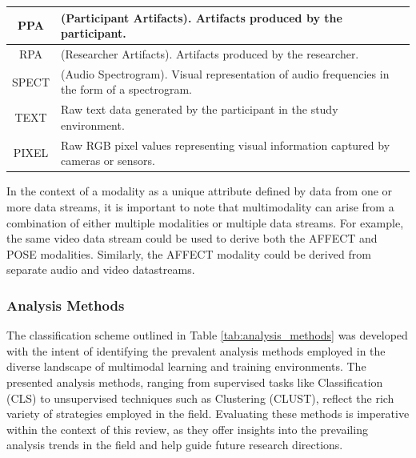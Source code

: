 \documentclass[manuscript,screen,review]{acmart}
\begin{document}
\begin{table}[ht]
\begin{tabular}{|c|p{}|}
    \hline
    PPA & (Participant Artifacts). Artifacts produced by the participant. \\
    \hline
    RPA & (Researcher Artifacts). Artifacts produced by the researcher. \\
    \hline
    SPECT & (Audio Spectrogram). Visual representation of audio frequencies in the form of a spectrogram. \\
    \hline
    TEXT & Raw text data generated by the participant in the study environment. \\
    \hline
    PIXEL & Raw RGB pixel values representing visual information captured by cameras or sensors. \\
    \hline
  \end{tabular}
  \label{tab:modalities}
\end{table}

In the context of a modality as a unique attribute defined by data from one or more data streams, it is important to note that multimodality can arise from a combination of either multiple modalities or multiple data streams. For example, the same video data stream could be used to derive both the AFFECT and POSE modalities. %
Similarly, the AFFECT modality could be derived from separate audio and video datastreams. %

\subsubsection{Analysis Methods} \label{subsec:analyis_methods}

The classification scheme outlined in Table \ref{tab:analysis_methods} was developed with the intent of identifying the prevalent analysis methods employed in the diverse landscape of multimodal learning and training environments. The presented analysis methods, ranging from supervised tasks like Classification (CLS) to unsupervised techniques such as Clustering (CLUST), reflect the rich variety of strategies employed in the field. Evaluating these methods is imperative within the context of this review, as they offer insights into the prevailing analysis trends in the field and help guide future research directions.
\end{document}
